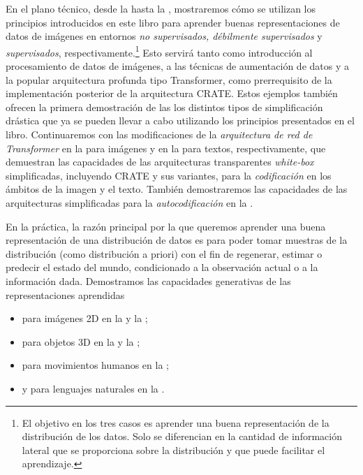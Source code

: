\documentclass[../../book-main_es.tex]{subfiles}
\begin{document}
En el plano técnico, desde la  hasta la
, mostraremos cómo se utilizan los principios
introducidos en este libro para aprender buenas representaciones de datos de imágenes
en entornos {\em no supervisados, débilmente supervisados} y {\em supervisados},
respectivamente.\footnote{El objetivo en los tres casos es aprender una buena representación 
de la distribución de los datos. Solo se diferencian en la cantidad de información lateral 
que se proporciona sobre la distribución y que puede facilitar el aprendizaje.} Esto servirá tanto como
introducción al procesamiento de datos de imágenes, a las técnicas de aumentación de datos y a la popular 
arquitectura profunda tipo Transformer, como prerrequisito de la implementación posterior de la arquitectura 
CRATE. Estos ejemplos también ofrecen la primera demostración de las los distintos tipos de simplificación drástica que 
ya se pueden llevar a cabo utilizando los principios presentados en el libro. Continuaremos
con las modificaciones de la \textit{arquitectura de red de Transformer} en la  
para imágenes y en la  para textos, respectivamente, que demuestran las capacidades 
de las arquitecturas transparentes \textit{white-box} simplificadas, incluyendo CRATE y sus variantes, para 
la \textit{codificación} en los ámbitos de la imagen y el texto. También demostraremos las capacidades 
de las arquitecturas simplificadas para la \textit{autocodificación} en la . %

En la práctica, la razón principal por la que queremos aprender una buena
representación de una distribución de datos es para poder tomar muestras de la
distribución (como distribución a priori) con el fin de regenerar, estimar o predecir el
estado del mundo, condicionado a la observación actual o a la información dada. 
Demostramos las capacidades generativas de las representaciones aprendidas
\begin{itemize}
\item para imágenes 2D en la  y la
;
\item para objetos 3D en la
 y la ;
\item para movimientos humanos en la ;
\item y para lenguajes naturales en la .
\end{itemize} 
\end{document}
